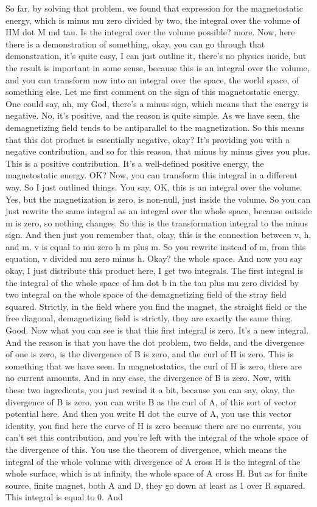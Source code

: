 So far, by solving that problem, we found that expression for the magnetostatic energy, which is minus mu zero divided by two, the integral over the volume of HM dot M md tau. Is the integral over the volume possible? more. Now, here there is a demonstration of something, okay, you can go through that demonstration, it's quite easy, I can just outline it, there's no physics inside, but the result is important in some sense, because this is an integral over the volume, and you can transform now into an integral over the space, the world space, of something else. Let me first comment on the sign of this magnetostatic energy. One could say, ah, my God, there's a minus sign, which means that the energy is negative. No, it's positive, and the reason is quite simple. As we have seen, the demagnetizing field tends to be antiparallel to the magnetization. So this means that this dot product is essentially negative, okay? It's providing you with a negative contribution, and so for this reason, that minus by minus gives you plus. This is a positive contribution. It's a well-defined positive energy, the magnetostatic energy. OK? Now, you can transform this integral in a different way. So I just outlined things. You say, OK, this is an integral over the volume. Yes, but the magnetization is zero, is non-null, just inside the volume. So you can just rewrite the same integral as an integral over the whole space, because outside m is zero, so nothing changes. So this is the transformation integral to the minus sign. And then just you remember that, okay, this is the connection between v, h, and m. v is equal to mu zero h m plus m. So you rewrite instead of m, from this equation, v divided mu zero minus h. Okay? the whole space. And now you say okay, I just distribute this product here, I get two integrals. The first integral is the integral of the whole space of hm dot b in the tau plus mu zero divided by two integral on the whole space of the demagnetizing field of the stray field squared. Strictly, in the field where you find the magnet, the straight field or the free diagonal, demagnetizing field is strictly, they are exactly the same thing. Good. Now what you can see is that this first integral is zero. It's a new integral. And the reason is that you have the dot problem, two fields, and the divergence of one is zero, is the divergence of B is zero, and the curl of H is zero. This is something that we have seen. In magnetostatics, the curl of H is zero, there are no current amounts. And in any case, the divergence of B is zero. Now, with these two ingredients, you just rewind it a bit, because you can say, okay, the divergence of B is zero, you can write B as the curl of A, of this sort of vector potential here. And then you write H dot the curve of A, you use this vector identity, you find here the curve of H is zero because there are no currents, you can't set this contribution, and you're left with the integral of the whole space of the divergence of this. You use the theorem of divergence, which means the integral of the whole volume with divergence of A cross H is the integral of the whole surface, which is at infinity, the whole space of A cross H. But as for finite source, finite magnet, both A and D, they go down at least as 1 over R squared. This integral is equal to 0. And 